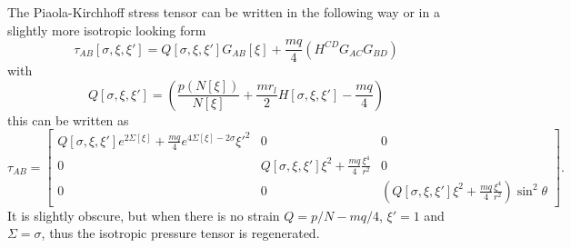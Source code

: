 The Piaola-Kirchhoff stress tensor can be written in the following way
or in a slightly more isotropic looking form
\begin{equation}
\tau_{AB}[\sigma,\xi,\xi'] = Q[\sigma,\xi,\xi']G_{AB}[\xi] +
\frac{mq}{4}\left(H^{CD}G_{AC}G_{BD}\right)
\end{equation}
with
\begin{equation}
Q[\sigma,\xi,\xi'] = \left(\frac{p(N[\xi])}{N[\xi]} +
\frac{mr_l}{2}H[\sigma,\xi,\xi']-\frac{mq}{4}\right)
\end{equation}
this can be written as
\begin{equation}
\tau_{AB} = \left[
  \begin{array}{ccc}
    Q[\sigma,\xi,\xi']e^{2\Sigma[\xi]} +
\frac{mq}{4}e^{4\Sigma[\xi]-2\sigma}\xi'^2& 0 & 0\\
    0 & Q[\sigma,\xi,\xi']\xi^2 +
\frac{mq}{4}\frac{\xi^4}{r^2}& 0 \\
    0 & 0 & \left(Q[\sigma,\xi,\xi']\xi^2 +
\frac{mq}{4}\frac{\xi^4}{r^2}\right)\sin^2\theta
  \end{array}
\right].
\end{equation}
It is slightly obscure, but when there is no strain $Q=p/N - mq/4$, $\xi'=1$ and $\Sigma=\sigma$, thus the isotropic pressure tensor is regenerated.


